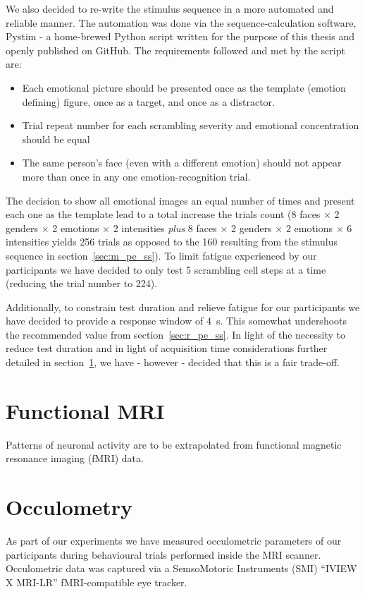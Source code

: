 	    We also decided to re-write the stimulus sequence in a more automated and reliable manner.
	    The automation was done via the sequence-calculation software, Pystim\cite{pystim} - a home-brewed Python script written for the purpose of this thesis and openly published on GitHub.
	    The requirements followed and met by the script are:
	    \begin{itemize}
		\item Each emotional picture should be presented once as the template (emotion defining) figure, once as a target, and once as a distractor.
		\item Trial repeat number for each scrambling severity and emotional concentration should be equal
		\item The same person's face (even with a different emotion) should not appear more than once in any one emotion-recognition trial.
	    \end{itemize}
	    The decision to show all emotional images an equal number of times and present each one as the template lead to a total increase the trials count
	    (8 faces $\times$ 2 genders $\times$ 2 emotions $\times$ 2 intensities \textit{plus} 8 faces $\times$ 2 genders $\times$ 2 emotions $\times$ 6 intensities yields 256 trials as opposed to the 160 resulting from the stimulus sequence in section~\ref{sec:m_pe_ss}).
	    To limit fatigue experienced by our participants we have decided to only test 5 scrambling cell steps at a time (reducing the trial number to 224).
	    
	    Additionally, to constrain test duration and relieve fatigue for our participants we have decided to provide a response window of \SI{4}{\second}.
	    This somewhat undershoots the recommended value from section~\ref{sec:r_pe_ss}.
	    In light of the necessity to reduce test duration and in light of acquisition time considerations further detailed in section~\ref{sec:m_fmri}, we have - however - decided that this is a fair trade-off.
    \section{Functional MRI}\label{sec:m_fmri}
	Patterns of neuronal activity are to be extrapolated from functional magnetic resonance imaging (fMRI) data.
    \section{Occulometry}\label{sec:m_om}
	As part of our experiments we have measured occulometric parameters of our participants during behavioural trials performed inside the MRI scanner.
	Occulometric data was captured via a SemsoMotoric Instruments (SMI) “IVIEW X\textsuperscript{\small\texttrademark} MRI-LR” fMRI-compatible eye tracker.
